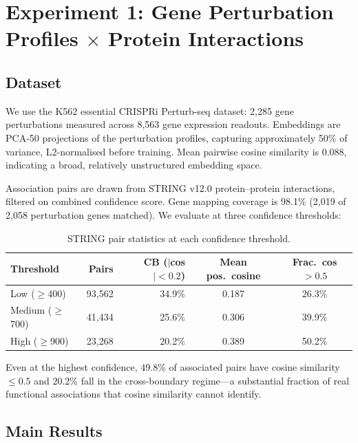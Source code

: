 \documentclass[11pt]{article}
\begin{document}
\section{Experiment 1: Gene Perturbation Profiles $\times$ Protein Interactions}
\label{sec:replogle}

\subsection{Dataset}

We use the \citet{replogle2022mapping} K562 essential CRISPRi Perturb-seq dataset: 2,285 gene perturbations measured across 8,563 gene expression readouts. Embeddings are PCA-50 projections of the perturbation profiles, capturing approximately 50\% of variance, L2-normalised before training. Mean pairwise cosine similarity is 0.088, indicating a broad, relatively unstructured embedding space.

Association pairs are drawn from STRING v12.0 \citep{szklarczyk2023string} protein--protein interactions, filtered on combined confidence score. Gene mapping coverage is 98.1\% (2,019 of 2,058 perturbation genes matched). We evaluate at three confidence thresholds:

\begin{table}[h]
\centering
\caption{STRING pair statistics at each confidence threshold.}
\label{tab:dataset}
\begin{tabular}{lrrcc}
\toprule
Threshold & Pairs & CB ($|$cos$| < 0.2$) & Mean pos.\ cosine & Frac.\ cos $> 0.5$ \\
\midrule
Low ($\geq$400) & 93{,}562 & 34.9\% & 0.187 & 26.3\% \\
Medium ($\geq$700) & 41{,}434 & 25.6\% & 0.306 & 39.9\% \\
High ($\geq$900) & 23{,}268 & 20.2\% & 0.389 & 50.2\% \\
\bottomrule
\end{tabular}
\end{table}

Even at the highest confidence, 49.8\% of associated pairs have cosine similarity $\leq 0.5$ and 20.2\% fall in the cross-boundary regime---a substantial fraction of real functional associations that cosine similarity cannot identify.

\subsection{Main Results}
\end{document}
